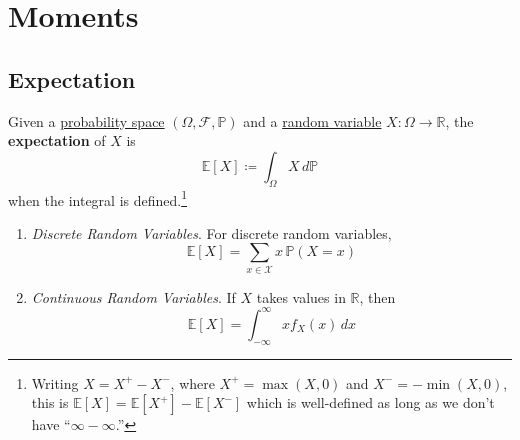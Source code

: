 \section{Moments}

\subsection{Expectation}

  \begin{definition}[Expectation]
    \label{def:expectation}
    Given a \hyperref[def:probability-space]{probability space} $(\Omega, \mathcal{F}, \mathbb{P})$ and a \hyperref[def:random-variable]{random variable} $X: \Omega \to \mathbb{R}$, the \textbf{expectation} of $X$ is 
    \begin{equation}
      \mathbb{E}[X] \coloneqq \int_\Omega X \, d\mathbb{P}
    \end{equation}
		when the integral is defined.\footnote{Writing $X = X^+ - X^-$, where $X^+ = \max(X, 0)$ and $X^- = - \min(X, 0)$, this is $\mathbb{E}[X] = \mathbb{E}[X^+] - \mathbb{E}[X^-]$ which is well-defined as long as we don't have ``$\infty - \infty$.'' } 
		\begin{enumerate}
		  \item \textit{Discrete Random Variables}. For discrete random variables, 
				\begin{equation}
					\mathbb{E}[X] = \sum_{x \in \mathcal{X}} x \, \mathbb{P}(X = x)
				\end{equation}

			\item \textit{Continuous Random Variables}. If $X$ takes values in $\mathbb{R}$, then 
				\begin{equation}
					\mathbb{E}[X] = \int_{-\infty}^\infty x f_X (x)\,dx 
				\end{equation}
		\end{enumerate}
  \end{definition}
